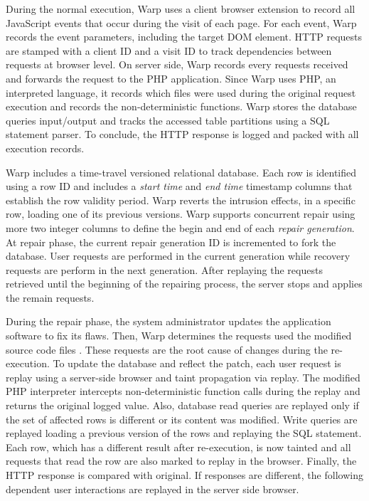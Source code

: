 During the normal execution, Warp uses a client browser extension to record all JavaScript events that occur during the visit of each page. For each event, Warp records the event parameters, including the target \acf{DOM} element. \ac{HTTP} requests are stamped with a client ID and a visit ID to track dependencies between requests at browser level. On server side, Warp records every requests received and forwards the request to the PHP application. Since Warp uses PHP, an interpreted language, it records which files were used during the original request execution and records the non-deterministic functions. Warp stores the database queries input/output and tracks the accessed table partitions using a \ac{SQL} statement parser. To conclude, the \ac{HTTP} response is logged and packed with all execution records.

Warp includes a time-travel versioned relational database. Each row is identified using a row ID and includes a \textit{start time} and \textit{end time} timestamp columns that establish the row validity period. Warp reverts the intrusion effects, in a specific row, loading one of its previous versions. Warp supports concurrent repair using more two integer columns to define the begin and end of each \textit{repair generation}. At repair phase, the current repair generation ID is incremented to fork the database. User requests are performed in the current generation while recovery requests are perform in the next generation. After replaying the requests retrieved until the beginning of the repairing process, the server stops and applies the remain requests.

During the repair phase, the system administrator updates the application software to fix its flaws. Then, Warp determines the requests used the modified source code files \cite{poirot,Wang2011}. These requests are the root cause of changes during the re-execution. To update the database and reflect the patch, each user request is replay using a server-side browser and taint propagation via replay. The modified PHP interpreter intercepts non-deterministic function calls during the replay and returns the original logged value. Also, database read queries are replayed only if the set of affected rows is different or its content was modified. Write queries are replayed loading a previous version of the rows and replaying the \ac{SQL} statement. Each row, which has a different result after re-execution, is now tainted and all requests that read the row are also marked to replay in the browser. Finally, the \ac{HTTP} response is compared with original. If responses are different, the following dependent user interactions are replayed in the server side browser.

